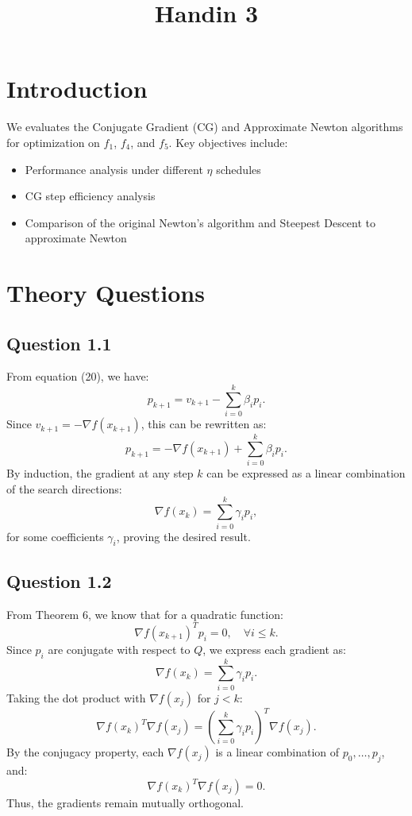 \documentclass[12pt]{article}
\title{Handin 3}
\begin{document}
\maketitle

\section{Introduction}


We evaluates the Conjugate Gradient (CG) and Approximate Newton algorithms for optimization on $f_1$, $f_4$, and $f_5$. Key objectives include:
\begin{itemize}
    \item Performance analysis under different $\eta$ schedules
    \item CG step efficiency analysis
    \item Comparison of the original Newton's algorithm and Steepest Descent to approximate Newton
\end{itemize}


\section{Theory Questions}
\subsection{Question 1.1}

From equation (20), we have:
\[
p_{k+1} = v_{k+1} - \sum_{i=0}^{k} \beta_i p_i.
\]
Since $v_{k+1} = -\nabla f(x_{k+1})$, this can be rewritten as:
\[
p_{k+1} = -\nabla f(x_{k+1}) + \sum_{i=0}^{k} \beta_i p_i.
\]
By induction, the gradient at any step $k$ can be expressed as a linear combination of the search directions:
\[
\nabla f(x_k) = \sum_{i=0}^{k} \gamma_i p_i,
\]
for some coefficients $\gamma_i$, proving the desired result.

\subsection{Question 1.2}

From Theorem 6, we know that for a quadratic function:
\[
\nabla f(x_{k+1})^T p_i = 0, \quad \forall i \leq k.
\]
Since $p_i$ are conjugate with respect to $Q$, we express each gradient as:
\[
\nabla f(x_k) = \sum_{i=0}^{k} \gamma_i p_i.
\]
Taking the dot product with $\nabla f(x_j)$ for $j < k$:
\[
\nabla f(x_k)^T \nabla f(x_j) = \left( \sum_{i=0}^{k} \gamma_i p_i \right)^T \nabla f(x_j).
\]
By the conjugacy property, each $\nabla f(x_j)$ is a linear combination of $p_0, \dots, p_j$, and:
\[
\nabla f(x_k)^T \nabla f(x_j) = 0.
\]
Thus, the gradients remain mutually orthogonal.
\end{document}
